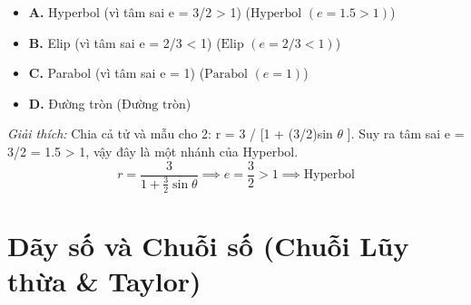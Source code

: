 \documentclass[11pt,a4paper,oneside]{book}
\begin{document}
\begin{enumerate}[label=\textbf{Câu \arabic*:}, leftmargin=2.2em, itemsep=8pt]
\begin{itemize}[label={}, leftmargin=1em, itemsep=2pt]
    \item \textbf{A.} Hyperbol (vì tâm sai e = 3/2 > 1) \quad ($\text{Hyperbol } (e = 1.5 > 1)$)
    \item \textbf{B.} Elip (vì tâm sai e = 2/3 < 1) \quad ($\text{Elip } (e = 2/3 < 1)$)
    \item \textbf{C.} Parabol (vì tâm sai e = 1) \quad ($\text{Parabol } (e = 1)$)
    \item \textbf{D.} Đường tròn \quad ($\text{Đường tròn}$)
  \end{itemize}
  \vspace{2pt}
   \textit{Giải thích:} Chia cả tử và mẫu cho 2: r = 3 / [1 + (3/2)sin $\theta$ ]. Suy ra tâm sai e = 3/2 = 1.5 > 1, vậy đây là một nhánh của Hyperbol.
  \[ r = \frac{3}{1 + \frac{3}{2}\sin\theta} \implies e = \frac{3}{2} > 1 \implies \text{Hyperbol} \]
\end{enumerate}

\chapter{Dãy số và Chuỗi số (Chuỗi Lũy thừa \& Taylor)}
\label{chap:chuong-11}
\end{document}
